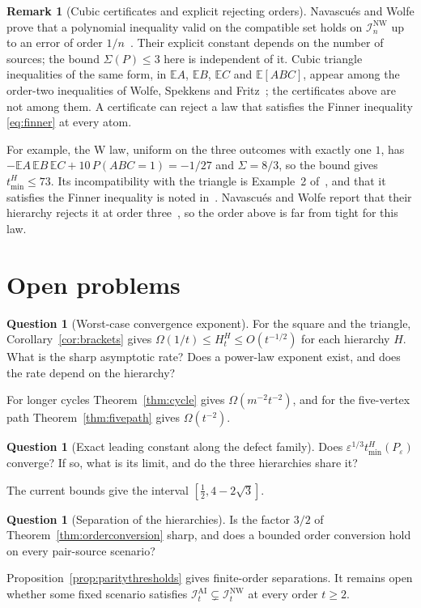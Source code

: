 \documentclass[11pt]{article}
\theoremstyle{plain}
\theoremstyle{definition}
\newtheorem{remark}[theorem]{Remark}
\newtheorem{question}[theorem]{Question}
\newcommand{\INW}{\mathcal I^{\mathrm{NW}}}
\newcommand{\IAI}{\mathcal I^{\mathrm{AI}}}
\newcommand{\eps}{\varepsilon}
\newcommand{\E}{\mathbb E}
\newcommand{\tmin}{t_{\min}}
\begin{document}
\begin{remark}[Cubic certificates and explicit rejecting orders]
Navascués and Wolfe prove that a polynomial inequality valid on the compatible set holds on $\INW_n$ up to an error of order $1/n$~\cite[Theorem 1, eqs.~(34) and (A5)]{NW2020}. Their explicit constant depends on the number of sources; the bound $\Sigma(P)\le3$ here is independent of it. Cubic triangle inequalities of the same form, in $\E A$, $\E B$, $\E C$ and $\E[ABC]$, appear among the order-two inequalities of Wolfe, Spekkens and Fritz~\cite[Section IV C, eqs.~(51)--(54) of arXiv v5]{WSF2019}; the certificates above are not among them. A certificate can reject a law that satisfies the Finner inequality \eqref{eq:finner} at every atom.

For example, the W law, uniform on the three outcomes with exactly one $1$, has $-\E A\,\E B\,\E C+10\,P(ABC=1)=-1/27$ and $\Sigma=8/3$, so the bound gives $\tmin^H\le73$. Its incompatibility with the triangle is Example~2 of~\cite{WSF2019}, and that it satisfies the Finner inequality is noted in~\cite[footnote 4]{Renou2019}. Navascués and Wolfe report that their hierarchy rejects it at order three~\cite[footnote 2]{NW2020}, so the order above is far from tight for this law.
\end{remark}

\section{Open problems}\label{sec:open}

\begin{question}[Worst-case convergence exponent]\label{q:hausdorff}
For the square and the triangle, Corollary~\ref{cor:brackets} gives $\Omega(1/t)\le H_t^H\le O(t^{-1/2})$ for each hierarchy $H$. What is the sharp asymptotic rate? Does a power-law exponent exist, and does the rate depend on the hierarchy?
\end{question}
For longer cycles Theorem~\ref{thm:cycle} gives $\Omega(m^{-2}t^{-2})$, and for the five-vertex path Theorem~\ref{thm:fivepath} gives $\Omega(t^{-2})$.

\begin{question}[Exact leading constant along the defect family]\label{q:constant}
Does $\eps^{1/3}\tmin^H(P_\eps)$ converge? If so, what is its limit, and do the three hierarchies share it?
\end{question}
The current bounds give the interval $[\tfrac12,4-2\sqrt3]$.

\begin{question}[Separation of the hierarchies]\label{q:separation}
Is the factor $3/2$ of Theorem~\ref{thm:orderconversion} sharp, and does a bounded order conversion hold on every pair-source scenario?
\end{question}
Proposition~\ref{prop:paritythresholds} gives finite-order separations. It remains open whether some fixed scenario satisfies $\IAI_t\subsetneq\INW_t$ at every order $t\ge2$.
\end{document}
